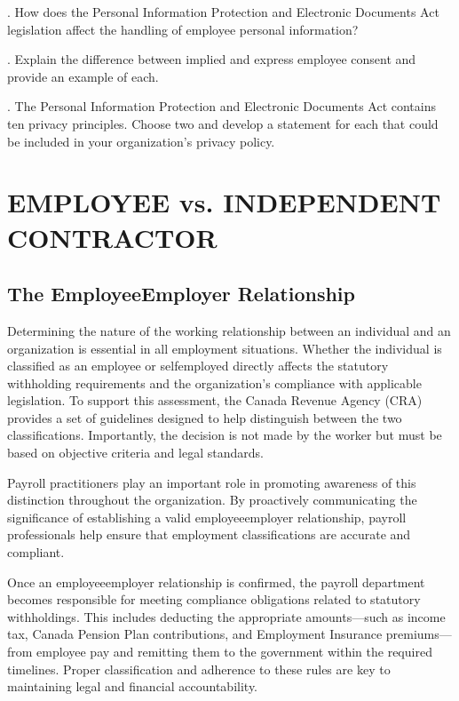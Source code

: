 \documentclass[letterpaper,10pt,english]{sphinxmanual}
\begin{document}
. How does the Personal Information Protection and Electronic Documents Act
legislation affect the handling of employee personal information?

. Explain the difference between implied and express employee consent and provide an
example of each.

. The Personal Information Protection and Electronic Documents Act contains ten
privacy principles. Choose two and develop a statement for each that could be included
in your organization’s privacy policy.

\sphinxstepscope


\chapter{EMPLOYEE vs. INDEPENDENT CONTRACTOR}
\label{\detokenize{3_contracts:employee-vs-independent-contractor}}\label{\detokenize{3_contracts::doc}}

\section{The Employee\sphinxhyphen{}Employer Relationship}
\label{\detokenize{3_contracts:the-employee-employer-relationship}}
\sphinxAtStartPar
Determining the nature of the working relationship between an individual and an organization is essential in all employment situations. Whether the individual is classified as an employee or self\sphinxhyphen{}employed directly affects the statutory withholding requirements and the organization’s compliance with applicable legislation. To support this assessment, the Canada Revenue Agency (CRA) provides a set of guidelines designed to help distinguish between the two classifications. Importantly, the decision is not made by the worker but must be based on objective criteria and legal standards.

\sphinxAtStartPar
Payroll practitioners play an important role in promoting awareness of this distinction throughout the organization. By proactively communicating the significance of establishing a valid employee\sphinxhyphen{}employer relationship, payroll professionals help ensure that employment classifications are accurate and compliant.

\sphinxAtStartPar
Once an employee\sphinxhyphen{}employer relationship is confirmed, the payroll department becomes responsible for meeting compliance obligations related to statutory withholdings. This includes deducting the appropriate amounts—such as income tax, Canada Pension Plan contributions, and Employment Insurance premiums—from employee pay and remitting them to the government within the required timelines. Proper classification and adherence to these rules are key to maintaining legal and financial accountability.
\end{document}

